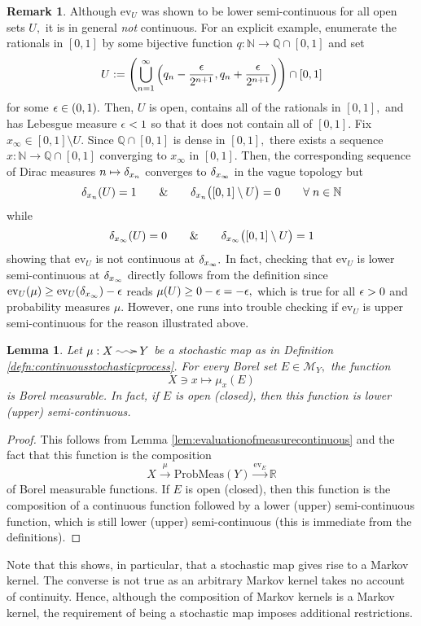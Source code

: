 \documentclass[12pt]{article}
\makeatletter
\theoremstyle{theorem}
\newtheorem{lemma}[equation]{Lemma}
\theoremstyle{definition}
\newtheorem{remark}[equation]{Remark}
\numberwithin{equation}{section}
\newcommand{\be}{\begin{equation}}
\newcommand{\ee}{\end{equation}}
\newcommand{\blem}{\begin{lemma}}
\newcommand{\elem}{\end{lemma}}
\newcommand{\bprf}{\begin{proof}}
\newcommand{\eprf}{\end{proof}}
\newcommand{\br}{\begin{remark}}
\newcommand{\er}{\end{remark}}
\newcommand{\<}{\langle}
\renewcommand{\>}{\rangle}
\newcommand{\aand}{\qquad \& \qquad}
\def\R{{{\mathbb R}}}
\def\N{{{\mathbb N}}}
\def\Q{{{\mathbb Q}}}
\newcommand{\stoch}{\;\xy0;/r.25pc/:\ar@{~>}(3,0);(-3,0);\endxy\;}
\makeatother
\begin{document}
\br
\label{rmk:LSCversusC}
Although $\mathrm{ev}_{U}$ was shown to be lower semi-continuous
for all open sets $U,$ it is in general \emph{not} continuous. 
For an explicit example, 
enumerate the rationals in $[0,1]$ by some bijective function 
$q:\N\to\Q\cap[0,1]$ and set
\be
U:=\left(\bigcup_{n=1}^{\infty}\left(q_{n}-\frac{\e}{2^{n+1}},q_{n}+\frac{\e}{2^{n+1}}\right)\right)\cap[0,1]
\ee
for some $\epsilon\in(0,1).$ Then, $U$ is open, 
contains all of the rationals in $[0,1],$
and has Lebesgue measure $\epsilon<1$ so that it does not contain all of $[0,1].$ 
Fix $x_{\infty}\in[0,1]\setminus U.$ 
Since $\Q\cap[0,1]$ is dense in $[0,1],$ there exists a sequence
$x:\N\to\Q\cap[0,1]$ converging to $x_{\infty}$ in $[0,1].$ 
Then, the corresponding sequence of Dirac measures 
$n\mapsto\delta_{x_{n}}$ converges to $\delta_{x_{\infty}}$ in the vague topology
but
\be
\de_{x_{n}}(U)=1
\aand
\de_{x_{n}}\big([0,1]\setminus U\big)=0
\qquad\forall\;n\in\N
\ee
while
\be
\de_{x_{\infty}}(U)=0
\aand
\de_{x_{\infty}}\big([0,1]\setminus U\big)=1
\ee
showing that $\mathrm{ev}_{U}$ is not continuous at $\delta_{x_{\infty}}.$ 
In fact, checking that $\mathrm{ev}_{U}$ is lower semi-continuous 
at $\delta_{x_{\infty}}$ directly follows from the definition since
$\mathrm{ev}_{U}(\mu)\ge\mathrm{ev}_{U}(\delta_{x_{\infty}})-\epsilon$
reads
$\mu(U)\ge0-\epsilon=-\epsilon,$ which is true for all $\epsilon>0$ and probability measures $\mu.$ 
However, one runs into trouble checking if $\mathrm{ev}_{U}$ is upper
semi-continuous for the reason illustrated above. 
\er
 
\blem
\label{lem:evaluationmeasurable}
Let $\mu:X\stoch Y$ be a stochastic map as in 
Definition \ref{defn:continuousstochasticprocess}. 
For every Borel set $E\in\mathcal{M}_{Y},$
the function 
\be
X\ni x\mapsto\mu_{x}(E)
\ee
is Borel measurable. In fact, if $E$ is open (closed), then
this function is lower (upper) semi-continuous. 
\elem

\bprf
This follows from Lemma \ref{lem:evaluationofmeasurecontinuous}
and the fact that this function is the composition
\be
X\xrightarrow{\mu}\mathrm{ProbMeas}(Y)\xrightarrow{\mathrm{ev}_{E}}\R
\ee
of Borel measurable functions. If $E$ is open (closed), then this function is the 
composition of a continuous function followed by a 
lower (upper) semi-continuous
function, which is still lower (upper) semi-continuous 
(this is immediate from the definitions).
\eprf

Note that this shows, in particular, that a stochastic map gives rise to a 
Markov kernel. The converse is not true as an arbitrary Markov kernel takes
no account of continuity. Hence, although the composition of Markov kernels is 
a Markov kernel,
the requirement of being a stochastic map imposes additional restrictions.
\end{document}
